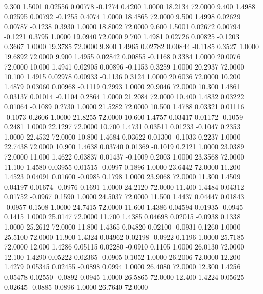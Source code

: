    9.300   1.5001   0.02556   0.00778  -0.1274   0.4200   1.0000  18.2134  72.0000
   9.400   1.4988   0.02595   0.00792  -0.1255   0.4074   1.0000  18.4865  72.0000
   9.500   1.4998   0.02629   0.00787  -0.1238   0.3930   1.0000  18.8002  72.0000
   9.600   1.5001   0.02672   0.00794  -0.1221   0.3795   1.0000  19.0940  72.0000
   9.700   1.4981   0.02726   0.00825  -0.1203   0.3667   1.0000  19.3785  72.0000
   9.800   1.4965   0.02782   0.00844  -0.1185   0.3527   1.0000  19.6892  72.0000
   9.900   1.4955   0.02842   0.00855  -0.1168   0.3384   1.0000  20.0076  72.0000
  10.000   1.4941   0.02905   0.00896  -0.1153   0.3259   1.0000  20.2937  72.0000
  10.100   1.4915   0.02978   0.00933  -0.1136   0.3124   1.0000  20.6036  72.0000
  10.200   1.4879   0.03060   0.00968  -0.1119   0.2993   1.0000  20.9046  72.0000
  10.300   1.4861   0.03137   0.01014  -0.1104   0.2864   1.0000  21.2084  72.0000
  10.400   1.4832   0.03222   0.01064  -0.1089   0.2730   1.0000  21.5282  72.0000
  10.500   1.4788   0.03321   0.01116  -0.1073   0.2606   1.0000  21.8255  72.0000
  10.600   1.4757   0.03417   0.01172  -0.1059   0.2481   1.0000  22.1297  72.0000
  10.700   1.4731   0.03511   0.01233  -0.1047   0.2353   1.0000  22.4532  72.0000
  10.800   1.4684   0.03622   0.01300  -0.1033   0.2237   1.0000  22.7438  72.0000
  10.900   1.4638   0.03740   0.01369  -0.1019   0.2121   1.0000  23.0389  72.0000
  11.000   1.4622   0.03837   0.01437  -0.1009   0.2003   1.0000  23.3568  72.0000
  11.100   1.4580   0.03955   0.01515  -0.0997   0.1896   1.0000  23.6442  72.0000
  11.200   1.4523   0.04091   0.01600  -0.0985   0.1798   1.0000  23.9068  72.0000
  11.300   1.4509   0.04197   0.01674  -0.0976   0.1691   1.0000  24.2120  72.0000
  11.400   1.4484   0.04312   0.01752  -0.0967   0.1590   1.0000  24.5037  72.0000
  11.500   1.4437   0.04447   0.01843  -0.0957   0.1508   1.0000  24.7415  72.0000
  11.600   1.4386   0.04594   0.01935  -0.0945   0.1415   1.0000  25.0147  72.0000
  11.700   1.4385   0.04698   0.02015  -0.0938   0.1338   1.0000  25.2612  72.0000
  11.800   1.4365   0.04820   0.02100  -0.0931   0.1260   1.0000  25.5100  72.0000
  11.900   1.4324   0.04962   0.02198  -0.0922   0.1196   1.0000  25.7185  72.0000
  12.000   1.4286   0.05115   0.02280  -0.0910   0.1105   1.0000  26.0130  72.0000
  12.100   1.4290   0.05222   0.02365  -0.0905   0.1052   1.0000  26.2006  72.0000
  12.200   1.4279   0.05345   0.02455  -0.0898   0.0994   1.0000  26.4080  72.0000
  12.300   1.4256   0.05478   0.02550  -0.0892   0.0945   1.0000  26.5865  72.0000
  12.400   1.4224   0.05625   0.02645  -0.0885   0.0896   1.0000  26.7640  72.0000
